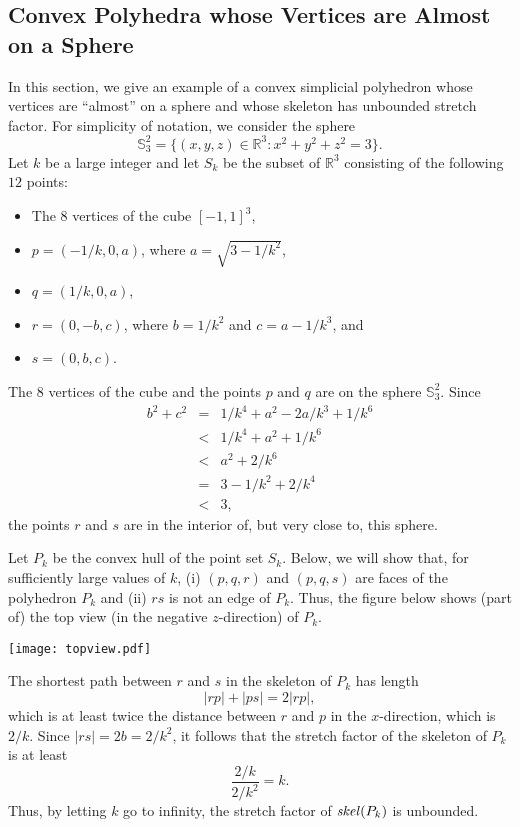 \documentclass[12pt]{article}
\newcommand{\IR}{\mathbb{R}}
\newcommand{\IS}{\mathbb{S}}
\newcommand{\skel}{\mathord{\it skel}}
\begin{document}
\subsection{Convex Polyhedra whose Vertices are Almost on a Sphere}  
\label{secalmost} 

In this section, we give an example of a convex simplicial polyhedron 
whose vertices are ``almost'' on a sphere and whose skeleton has 
unbounded stretch factor. For simplicity of notation, we consider the 
sphere 
\[ \IS_3^2 = \{ (x,y,z) \in \IR^3 : x^2 + y^2 + z^2 = 3 \} .   
\] 
Let $k$ be a large integer and let $S_k$ be the subset of $\IR^3$ 
consisting of the following $12$ points:
\begin{itemize}
\item The $8$ vertices of the cube $[-1,1]^3$,
\item $p = (-1/k,0,a)$, where $a=\sqrt{3-1/k^2}$,
\item $q = (1/k,0,a)$,
\item $r = (0,-b,c)$, where $b=1/k^2$ and $c=a-1/k^3$, and 
\item $s = (0,b,c)$.
\end{itemize}
The $8$ vertices of the cube and the points $p$ and $q$ are on the
sphere $\IS_3^2$. Since  
\begin{eqnarray*} 
 b^2 + c^2 & = & 1/k^4 + a^2 - 2a/k^3 + 1/k^6 \\ 
    & < & 1/k^4 + a^2 + 1/k^6 \\ 
    & < & a^2 + 2/k^6 \\ 
 & = & 3 - 1/k^2 + 2/k^4 \\ 
 & < & 3 ,  
\end{eqnarray*}
the points $r$ and $s$ are in the interior of, but very close to, this 
sphere.

Let $P_k$ be the convex hull of the point set $S_k$. Below, we will 
show that, for sufficiently large values of $k$, 
(i) $(p,q,r)$ and $(p,q,s)$ are faces of the polyhedron $P_k$ and 
(ii) $rs$ is not an edge of $P_k$. Thus, the figure below shows (part of) 
the top view (in the negative $z$-direction) of $P_k$.

\begin{center}
   \texttt{[image: topview.pdf]}
\end{center}

The shortest path between $r$ and $s$ in the skeleton of $P_k$ has 
length
\[ |rp|+|ps| = 2|rp| , 
\]
which is at least twice the distance between $r$ and $p$ in the
$x$-direction, which is $2/k$. Since $|rs|=2b=2/k^2$, it follows that
the stretch factor of the skeleton of $P_k$ is at least
\[ \frac{2/k}{2/k^2} = k . 
\]
Thus, by letting $k$ go to infinity, the stretch factor of $\skel(P_k)$ 
is unbounded.
\end{document}
